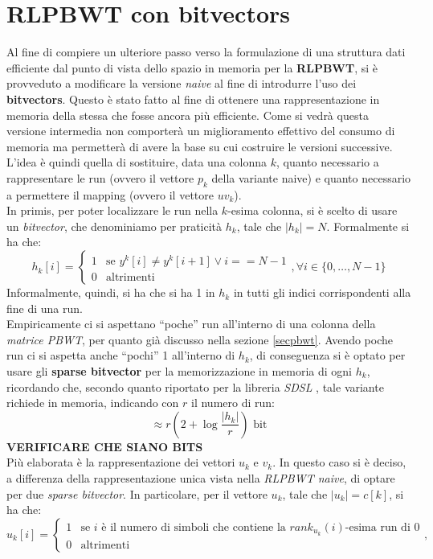 \section{RLPBWT con bitvectors}
Al fine di compiere un ulteriore passo verso la formulazione di una struttura
dati efficiente dal punto di vista dello spazio in memoria per la
\textbf{RLPBWT}, si è provveduto a modificare la versione \textit{naive} al fine
di introdurre l'uso dei \textbf{bitvectors}. Questo è stato fatto al fine di
ottenere una rappresentazione in memoria della stessa che fosse ancora più
efficiente. Come si vedrà questa versione intermedia non comporterà un
miglioramento effettivo del consumo di memoria ma permetterà di avere la base su
cui costruire le versioni successive.\\
L'idea è quindi quella di sostituire, data una colonna $k$, quanto necessario a
rappresentare le run (ovvero il vettore $p_k$ della variante naive) e quanto
necessario a permettere il mapping (ovvero il vettore $uv_k$).\\
In primis, per poter localizzare le run nella $k$-esima colonna, si è scelto di
usare un \textit{bitvector}, che denominiamo per praticità $h_k$, tale che
$|h_k|=N$. Formalmente si ha che:
\[h_k[i]=
  \begin{cases}
    1&\mbox{se } y^k[i]\neq y^k[i+1]\lor i==N-1\\
    0&\mbox{altrimenti}
  \end{cases},\forall i\in \{0,\ldots,N-1\}
\]
Informalmente, quindi, si ha che si ha 1 in $h_k$ in tutti gli indici
corrispondenti alla fine di una run.\\
Empiricamente ci si aspettano ``poche'' run all'interno di una colonna della
\textit{matrice PBWT}, per quanto già discusso nella sezione
\ref{secpbwt}. Avendo poche run ci si aspetta anche ``pochi'' 1 all'interno di
$h_k$, di conseguenza si è optato per usare gli \textbf{sparse bitvector} per la
memorizzazione in memoria di ogni $h_k$, ricordando che, secondo quanto
riportato per la libreria \textit{SDSL} \cite{sdsl}, tale variante richiede in
memoria, indicando con $r$ il numero di run:
\[\approx r\left(2+\log\frac{|h_k|}{r}\right)\mbox{ bit}\]
\textbf{VERIFICARE CHE SIANO BITS}\\
Più elaborata è la rappresentazione dei vettori $u_k$ e $v_k$. In questo caso si
è deciso, a differenza della rappresentazione unica vista nella \textit{RLPBWT
  naive}, di optare per due \textit{sparse bitvector}. In particolare, per il
vettore $u_k$, tale che $|u_k|=c[k]$, si ha che:
\[u_k[i]=
  \begin{cases}
    1&\mbox{se }i \mbox{ è il numero di simboli che contiene la
    }rank_{u_k}(i)\mbox{-esima run di 0}\\
    0&\mbox{altrimenti}
  \end{cases},
\]
